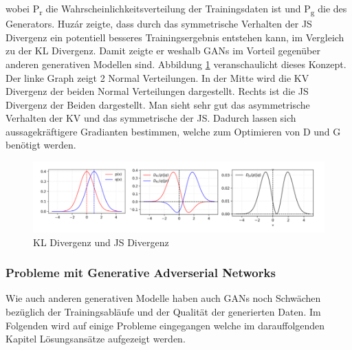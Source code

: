 \documentclass{llncs}
\begin{document}
wobei P\textsubscript{r} die Wahrscheinlichkeitsverteilung der Trainingsdaten ist und P\textsubscript{g} die des Generators. Huzár \cite{sha} zeigte, dass durch das symmetrische Verhalten der JS Divergenz ein potentiell besseres Trainingsergebnis entstehen kann, im Vergleich zu der KL Divergenz. Damit zeigte er weshalb GANs im Vorteil gegenüber anderen generativen Modellen sind. Abbildung \ref{fig:Bild21} veranschaulicht dieses Konzept. Der linke Graph zeigt 2 Normal Verteilungen. In der Mitte wird die KV Divergenz der beiden Normal Verteilungen dargestellt.  Rechts ist die JS Divergenz der Beiden dargestellt. Man sieht sehr gut das asymmetrische Verhalten der KV und das symmetrische der JS. Dadurch lassen sich aussagekräftigere Gradianten bestimmen, welche zum Optimieren von D und G benötigt werden\cite{sha}. 
 
\begin{figure}
	\centering
	\includegraphics[width=1.0\linewidth]{KLdiv}
	\caption{KL Divergenz und JS Divergenz}
	\label{fig:Bild21}
\end{figure}

\subsubsection{Probleme mit Generative Adverserial Networks}

Wie auch anderen generativen Modelle haben auch GANs noch Schwächen bezüglich der Trainingsabläufe und der Qualität der generierten Daten. Im Folgenden wird auf einige Probleme eingegangen welche im darauffolgenden Kapitel Lösungsansätze aufgezeigt werden. 
\end{document}
